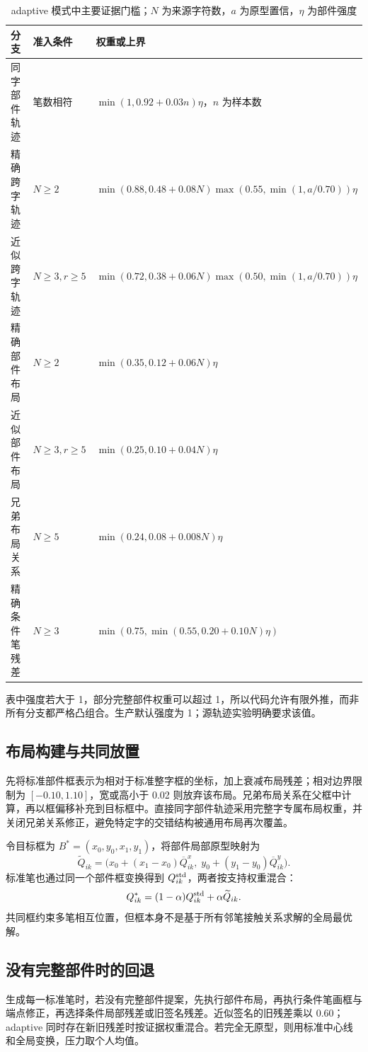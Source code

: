 \documentclass[UTF8,a4paper,11pt,fontset=fandol]{ctexart}
\begin{document}
\begin{table}[H]\centering\small
\caption{adaptive 模式中主要证据门槛；$N$ 为来源字符数，$a$ 为原型置信，$\eta$ 为部件强度}
\begin{tabularx}{\textwidth}{L{29mm}L{34mm}X}
\toprule
分支 & 准入条件 & 权重或上界\\\midrule
同字部件轨迹 & 笔数相符 & $\min(1,0.92+0.03n)\eta$，$n$ 为样本数\\
精确跨字轨迹 & $N\ge2$ & $\min(0.88,0.48+0.08N)\max(0.55,\min(1,a/0.70))\eta$\\
近似跨字轨迹 & $N\ge3,r\ge5$ & $\min(0.72,0.38+0.06N)\max(0.50,\min(1,a/0.70))\eta$\\
精确部件布局 & $N\ge2$ & $\min(0.35,0.12+0.06N)\eta$\\
近似部件布局 & $N\ge3,r\ge5$ & $\min(0.25,0.10+0.04N)\eta$\\
兄弟布局关系 & $N\ge5$ & $\min(0.24,0.08+0.008N)\eta$\\
精确条件笔残差 & $N\ge3$ & $\min(0.75,\min(0.55,0.20+0.10N)\eta)$\\
\bottomrule
\end{tabularx}
\end{table}
表中强度若大于 1，部分完整部件权重可以超过 1，所以代码允许有限外推，而非所有分支都严格凸组合。生产默认强度为 1；源轨迹实验明确要求该值。

\subsection{布局构建与共同放置}
先将标准部件框表示为相对于标准整字框的坐标，加上衰减布局残差；相对边界限制为 $[-0.10,1.10]$，宽或高小于 0.02 则放弃该布局。兄弟布局关系在父框中计算，再以框偏移补充到目标框中。直接同字部件轨迹采用完整字专属布局权重，并关闭兄弟关系修正，避免特定字的交错结构被通用布局再次覆盖。

令目标框为 $B^*=(x_0,y_0,x_1,y_1)$，将部件局部原型映射为
\begin{equation}
\widetilde Q_{ik}=\big(x_0+(x_1-x_0)\overline Q^x_{ik},\;
y_0+(y_1-y_0)\overline Q^y_{ik}\big).
\end{equation}
标准笔也通过同一个部件框变换得到 $Q^{\rm std}_{ik}$，两者按支持权重混合：
\begin{equation}
Q^*_{ik}=(1-\alpha)Q^{\rm std}_{ik}+\alpha\widetilde Q_{ik}.
\end{equation}
共同框约束多笔相互位置，但框本身不是基于所有邻笔接触关系求解的全局最优解。

\subsection{没有完整部件时的回退}
生成每一标准笔时，若没有完整部件提案，先执行部件布局，再执行条件笔画框与端点修正，再选择条件局部残差或旧签名残差。近似签名的旧残差乘以 0.60；adaptive 同时存在新旧残差时按证据权重混合。若完全无原型，则用标准中心线和全局变换，压力取个人均值。
\end{document}
